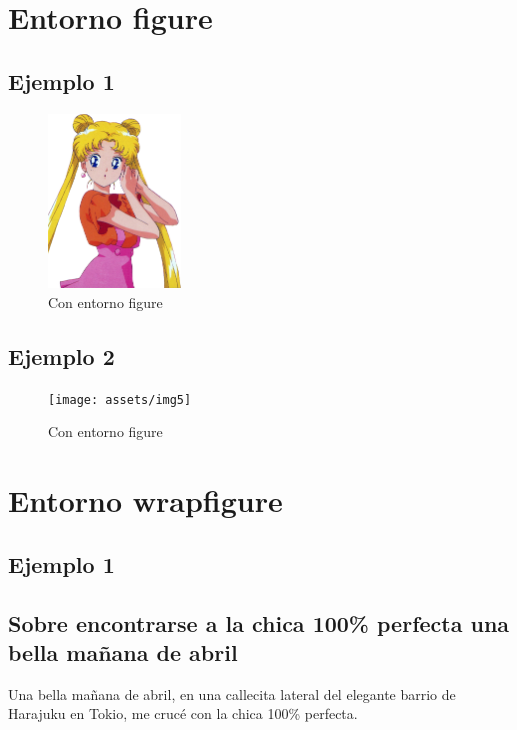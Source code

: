 \documentclass[letterpaper]{article}
\begin{document}
	\newpage
	\section{Entorno figure}
	\subsection{Ejemplo 1}
	
	\begin{figure}[h]
		\centering
		\caption{Con entorno figure}
		\includegraphics[width=100pt]{assets/img3_2}
	\end{figure}
	
	\subsection{Ejemplo 2}	
	\begin{figure}[h]
		\centering
		\texttt{[image: assets/img5]}
		\caption{Con entorno figure}
	\end{figure}
	
	\newpage
	\section{Entorno wrapfigure}
	
	\subsection{Ejemplo 1}
  \subsection*{Sobre encontrarse a la chica 100\% perfecta una bella mañana de
  abril}
	
  Una bella mañana de abril, en una callecita lateral del elegante barrio de
  Harajuku en Tokio, me crucé con la chica 100\% perfecta. \\
	
\end{document}
